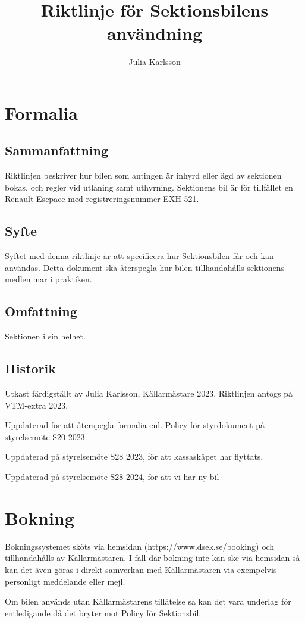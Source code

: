\documentclass{dsekprotokoll}
\author{Julia Karlsson}
\title{Riktlinje för Sektionsbilens användning}
\begin{document}
\maketitle
\section{Formalia}
\subsection{Sammanfattning}
Riktlinjen beskriver hur bilen som antingen är inhyrd eller ägd av sektionen bokas, och regler vid utlåning samt uthyrning. Sektionens bil är för tillfället en Renault Escpace med registreringsnummer EXH 521.

\subsection{Syfte}
Syftet med denna riktlinje är att specificera hur Sektionsbilen får och kan användas. Detta dokument ska återspegla hur bilen tillhandahålls sektionens medlemmar i praktiken.

\subsection{Omfattning}
Sektionen i sin helhet.

\subsection{Historik}
Utkast färdigställt av Julia Karlsson, Källarmästare 2023. Riktlinjen antogs på VTM-extra 2023.

Uppdaterad för att återspegla formalia enl. Policy för styrdokument på styrelsemöte S20 2023.

Uppdaterad på styrelsemöte S28 2023, för att kassaskåpet har flyttats.

Uppdaterad på styrelsemöte S28 2024, för att vi har ny bil

\section{Bokning}
Bokningssystemet sköts via hemsidan (https://www.dsek.se/booking) och tillhandahålls av Källarmästaren. I fall där bokning inte kan ske via hemsidan så kan det även göras i direkt samverkan med Källarmästaren via exempelvis personligt meddelande eller mejl. 

Om bilen används utan Källarmästarens tillåtelse så kan det vara underlag för entledigande då det bryter mot Policy för Sektionsbil. 
\end{document}
